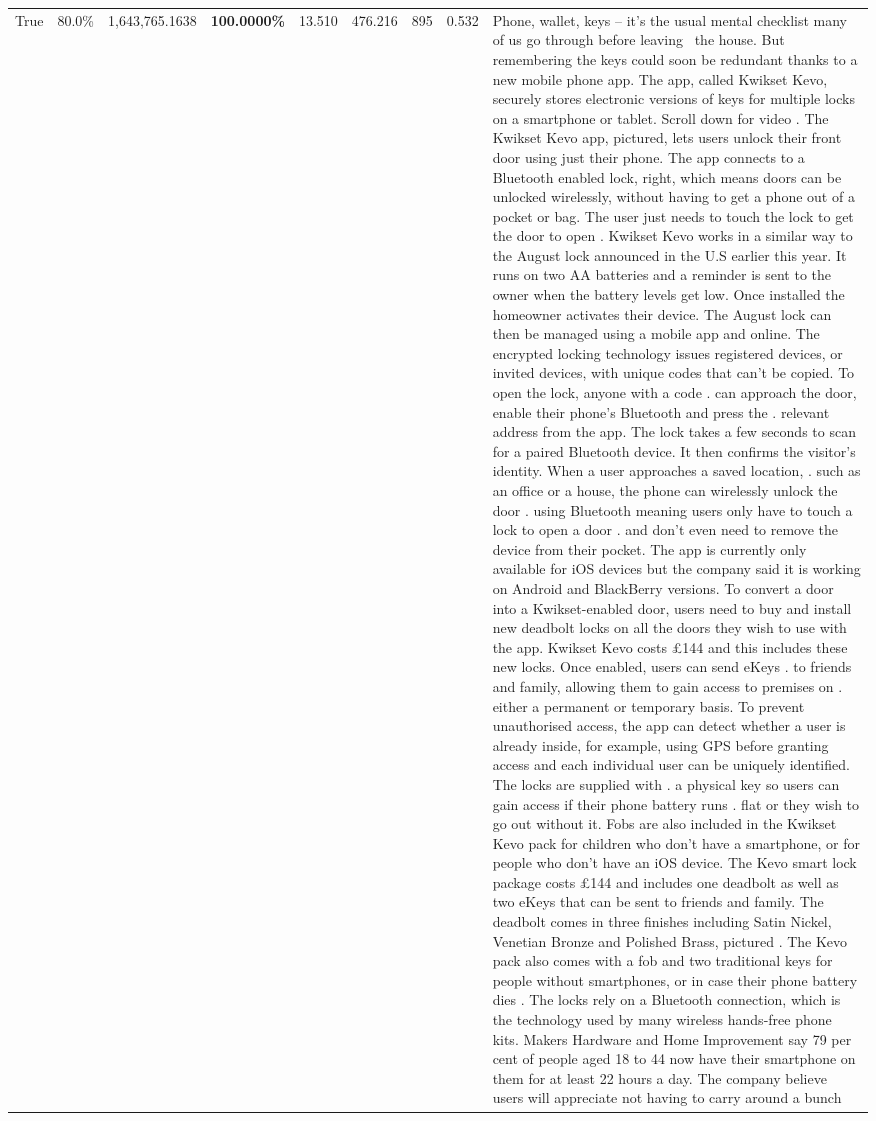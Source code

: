 \begin{table}[H]
\begin{tabular}{lllrlllll}
True & 80.0\% & 1,643,765.1638 & \bfseries \color{red} 100.0000\% & 13.510 & 476.216 & 895 & 0.532 & Phone, wallet, keys – it’s the usual mental checklist many of us go through before leaving  the house. But remembering the keys could soon be redundant thanks to a new mobile phone app. The app, called Kwikset Kevo, securely stores electronic versions of keys for multiple locks on a smartphone or tablet. Scroll down for video . The Kwikset Kevo app, pictured, lets users unlock their front door using just their phone. The app connects to a Bluetooth enabled lock, right, which means doors can be unlocked wirelessly, without having to get a phone out of a pocket or bag. The user just needs to touch the lock to get the door to open . Kwikset Kevo works in a similar way to the August lock announced in the U.S earlier this year. It runs on two AA batteries and a reminder is sent to the owner when the battery levels get low. Once installed the homeowner activates their device. The August lock can then be managed using a mobile app and online. The encrypted locking technology issues registered devices, or invited devices, with unique codes that can't be copied. To open the lock, anyone with a code . can approach the door, enable their phone's Bluetooth and press the . relevant address from the app. The lock takes a few seconds to scan for a paired Bluetooth device. It then confirms the visitor's identity. When a user approaches a saved location, . such as an office or a house, the phone can wirelessly unlock the door . using Bluetooth meaning users only have to touch a lock to open a door . and don't even need to remove the device from their pocket. The app is currently only available for iOS devices but the company said it is working on Android and BlackBerry versions. To convert a door into a Kwikset-enabled door, users need to buy and install new deadbolt locks on all the doors they wish to use with the app. Kwikset Kevo costs £144 and this includes these new locks. Once enabled, users can send eKeys . to friends and family, allowing them to gain access to premises on . either a permanent or temporary basis. To prevent unauthorised access, the app can detect whether a user is already inside, for example, using GPS before granting access and each individual user can be uniquely identified. The locks are supplied with . a physical key so users can gain access if their phone battery runs . flat or they wish to go out without it. Fobs are also included in the Kwikset Kevo pack for children who don't have a smartphone, or for people who don't have an iOS device. The Kevo smart lock package costs £144 and includes one deadbolt as well as two eKeys that can be sent to friends and family. The deadbolt comes in three finishes including Satin Nickel, Venetian Bronze and Polished Brass, pictured . The Kevo pack also comes with a fob and two traditional keys for people without smartphones, or in case their phone battery dies . The locks rely on a Bluetooth connection, which is the technology used by many wireless hands-free phone kits. Makers Hardware and Home Improvement say 79 per cent of people aged 18 to 44 now have their smartphone on them for at least 22 hours a day. The company believe users will appreciate not having to carry around a bunch 
\end{tabular}
\end{table}
